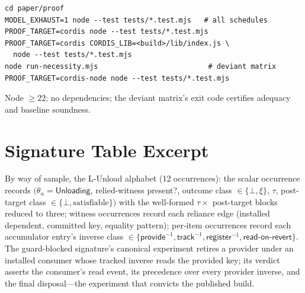 \documentclass[sigplan,screen,review,nonacm]{acmart}
\newcommand{\relied}{\mathrm{relied}}
\newcommand{\Unloading}{\mathsf{Unloading}}
\begin{document}
\begin{verbatim}
cd paper/proof
MODEL_EXHAUST=1 node --test tests/*.test.mjs   # all schedules
PROOF_TARGET=cordis node --test tests/*.test.mjs
PROOF_TARGET=cordis CORDIS_LIB=<build>/lib/index.js \
  node --test tests/*.test.mjs
node run-necessity.mjs                          # deviant matrix
PROOF_TARGET=cordis-node node --test tests/*.test.mjs
\end{verbatim}

Node $\ge 22$; no dependencies; the deviant matrix's exit code certifies
adequacy and baseline soundness.

\section{Signature Table Excerpt}\label{app:sig}

By way of sample, the L\mbox{-}Unload alphabet (12 occurrences): the scalar
occurrence records $(\theta_n = \Unloading$, $\relied$-witness present?,
outcome class $\in \{\bot, \xi\}$, $\tau$, post-target class
$\in \{\bot, \text{satisfiable}\})$ with the well-formed $\tau \times$
post-target blocks reduced to three; witness occurrences record each reliance
edge (installed dependent, committed key, equality pattern); per-item
occurrences record each accumulator entry's inverse class
$\in \{\mathsf{provide}^{-1}, \mathsf{track}^{-1}, \mathsf{register}^{-1},
\mathsf{read\mbox{-}on\mbox{-}revert}\}$. The guard-blocked signature's
canonical experiment retires a provider under an installed consumer whose
tracked inverse reads the provided key; its verdict asserts the consumer's
read event, its precedence over every provider inverse, and the final
disposal---the experiment that convicts the published build.
\end{document}
